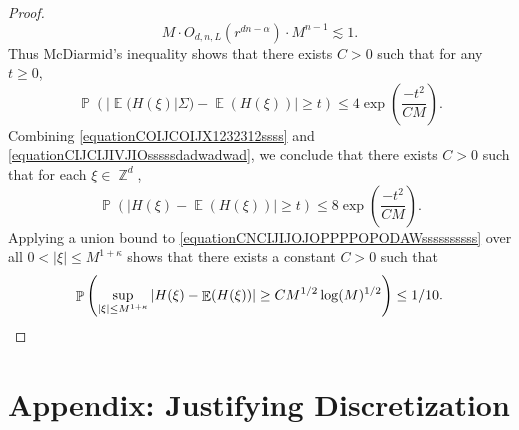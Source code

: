 \documentclass[dvipsnames,letterpaper,12pt]{article}
\numberwithin{equation}{section}
\DeclareMathOperator{\ZZ}{\mathbb{Z}}
\DeclareMathOperator{\TT}{\mathbb{T}}
\numberwithin{theorem}{section}
\DeclareMathOperator{\EE}{\mathbb{E}}
\DeclareMathOperator{\PP}{\mathbb{P}}
\begin{document}
\begin{proof}
    \begin{equation}
        M \cdot O_{d,n,L}(r^{dn - \alpha}) \cdot M^{n-1} \lesssim 1.
    \end{equation}
    Thus McDiarmid's inequality shows that there exists $C > 0$ such that for any $t \geq 0$,
    \begin{equation} \label{equationCIJCIJIVJIOsssssdadwadwad}
        \PP \left( |\EE(H(\xi)|\Sigma) - \EE(H(\xi))| \geq t \right) \leq 4 \exp \left( \frac{-t^2}{CM} \right).
    \end{equation}
    Combining \eqref{equationCOIJCOIJX1232312ssss} and \eqref{equationCIJCIJIVJIOsssssdadwadwad}, we conclude that there exists $C > 0$ such that for each $\xi \in \ZZ^d$,
    \begin{equation} \label{equationCNCIJIJOJOPPPPOPODAWssssssssss}
        \PP \left( | H(\xi) - \EE(H(\xi)) | \geq t  \right) \leq 8 \exp \left( \frac{-t^2}{CM} \right).
    \end{equation}
    Applying a union bound to \eqref{equationCNCIJIJOJOPPPPOPODAWssssssssss} over all $0 < |\xi| \leq M^{1 + \kappa}$ shows that there exists a constant $C > 0$ such that
    \[ \PP \left( \sup_{|\xi| \leq M^{1 + \kappa}} | H(\xi) - \EE(H(\xi)) | \geq C M^{1/2} \log(M)^{1/2} \right) \leq 1/10. \qedhere \]
\end{proof}

\section{Appendix: Justifying Discretization}

%
%
\end{document}
